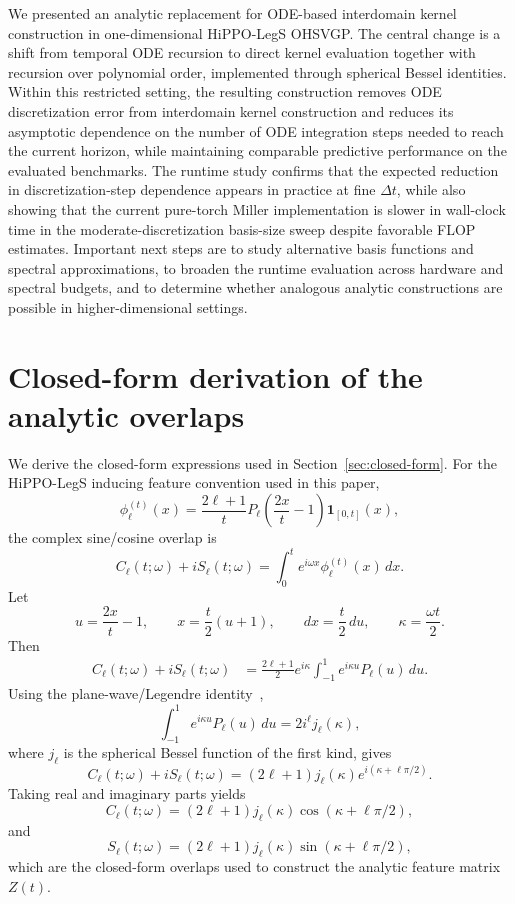 \documentclass{article}
\theoremstyle{plain}
\theoremstyle{definition}
\theoremstyle{remark}
\begin{document}
We presented an analytic replacement for ODE-based interdomain kernel construction in one-dimensional HiPPO-LegS OHSVGP. The central change is a shift from temporal ODE recursion to direct kernel evaluation together with recursion over polynomial order, implemented through spherical Bessel identities. Within this restricted setting, the resulting construction removes ODE discretization error from interdomain kernel construction and reduces its asymptotic dependence on the number of ODE integration steps needed to reach the current horizon, while maintaining comparable predictive performance on the evaluated benchmarks. The runtime study confirms that the expected reduction in discretization-step dependence appears in practice at fine $\Delta t$, while also showing that the current pure-torch Miller implementation is slower in wall-clock time in the moderate-discretization basis-size sweep despite favorable FLOP estimates. Important next steps are to study alternative basis functions and spectral approximations, to broaden the runtime evaluation across hardware and spectral budgets, and to determine whether analogous analytic constructions are possible in higher-dimensional settings.




\clearpage
\appendix
\onecolumn

\section{Closed-form derivation of the analytic overlaps}
\label{app:closed-form}

We derive the closed-form expressions used in Section~\ref{sec:closed-form}. For the HiPPO-LegS inducing feature convention used in this paper,
\[
\phi_\ell^{(t)}(x)
=
\frac{2\ell+1}{t}
P_\ell\!\left(\frac{2x}{t}-1\right)
\mathbf{1}_{[0,t]}(x),
\]
the complex sine/cosine overlap is
\[
C_\ell(t;\omega)+iS_\ell(t;\omega)
=
\int_0^t e^{i\omega x}\phi_\ell^{(t)}(x)\,dx.
\]
Let
\[
u=\frac{2x}{t}-1,
\qquad
x=\frac{t}{2}(u+1),
\qquad
dx=\frac{t}{2}\,du,
\qquad
\kappa=\frac{\omega t}{2}.
\]
Then
\[
\begin{aligned}
C_\ell(t;\omega)+iS_\ell(t;\omega)
&=
\frac{2\ell+1}{2}
e^{i\kappa}
\int_{-1}^{1}
e^{i\kappa u}P_\ell(u)\,du .
\end{aligned}
\]
Using the plane-wave/Legendre identity~\citep{DLMF},
\[
\int_{-1}^{1} e^{i\kappa u}P_\ell(u)\,du
=
2i^\ell j_\ell(\kappa),
\]
where \(j_\ell\) is the spherical Bessel function of the first kind, gives
\[
C_\ell(t;\omega)+iS_\ell(t;\omega)
=
(2\ell+1)j_\ell(\kappa)e^{i(\kappa+\ell\pi/2)}.
\]
Taking real and imaginary parts yields
\[
C_\ell(t;\omega)
=
(2\ell+1)j_\ell(\kappa)\cos(\kappa+\ell\pi/2),
\]
and
\[
S_\ell(t;\omega)
=
(2\ell+1)j_\ell(\kappa)\sin(\kappa+\ell\pi/2),
\]
which are the closed-form overlaps used to construct the analytic feature matrix \(Z(t)\).
\end{document}
